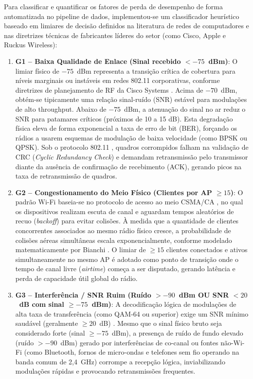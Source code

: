 Para classificar e quantificar os fatores de perda de desempenho de forma automatizada no pipeline de dados, implementou-se um classificador heurístico baseado em limiares de decisão definidos na literatura de redes de computadores e nas diretrizes técnicas de fabricantes líderes do setor (como Cisco, Apple e Ruckus Wireless):

\begin{enumerate}
    \item \textbf{G1 – Baixa Qualidade de Enlace (Sinal recebido $< -75$~dBm)}: O limiar físico de $-75$~dBm representa a transição crítica de cobertura para níveis marginais ou instáveis em redes 802.11 corporativas, conforme diretrizes de planejamento de RF da Cisco Systems \cite{cisco2020design}. Acima de $-70$~dBm, obtém-se tipicamente uma relação sinal-ruído (SNR) estável para modulações de alto throughput. Abaixo de $-75$~dBm, a atenuação do sinal no ar reduz o SNR para patamares críticos (próximos de 10 a 15 dB). Esta degradação física eleva de forma exponencial a taxa de erro de bit (BER), forçando os rádios a usarem esquemas de modulação de baixa velocidade (como BPSK ou QPSK). Sob o protocolo 802.11 \cite{gast2005}, quadros corrompidos falham na validação de CRC (\textit{Cyclic Redundancy Check}) e demandam retransmissão pelo transmissor diante da ausência de confirmação de recebimento (ACK), gerando picos na taxa de retransmissão de quadros.
    
    \item \textbf{G2 – Congestionamento do Meio Físico (Clientes por AP $\ge 15$)}: O padrão Wi-Fi baseia-se no protocolo de acesso ao meio CSMA/CA \cite{gast2005}, no qual os dispositivos realizam escuta de canal e aguardam tempos aleatórios de recuo (\textit{backoff}) para evitar colisões. À medida que a quantidade de clientes concorrentes associados ao mesmo rádio físico cresce, a probabilidade de colisões aéreas simultâneas escala exponencialmente, conforme modelado matematicamente por Bianchi \cite{bianchi2000}. O limiar de $\ge 15$ clientes conectados e ativos simultaneamente no mesmo AP é adotado como ponto de transição onde o tempo de canal livre (\textit{airtime}) começa a ser disputado, gerando latência e perda de capacidade útil global do rádio.
    
    \item \textbf{G3 – Interferência / SNR Ruim (Ruído $> -90$~dBm OU SNR $< 20$~dB com sinal $\ge -75$~dBm)}: A decodificação lógica de modulações de alta taxa de transferência (como QAM-64 ou superior) exige um SNR mínimo saudável (geralmente $\ge 20$~dB) \cite{gast2005}. Mesmo que o sinal físico bruto seja considerado forte (sinal $\ge -75$~dBm), a presença de ruído de fundo elevado (ruído $> -90$~dBm) gerado por interferências de co-canal ou fontes não-Wi-Fi (como Bluetooth, fornos de micro-ondas e telefones sem fio operando na banda comum de 2,4~GHz) corrompe a recepção lógica, inviabilizando modulações rápidas e provocando retransmissões frequentes.
    

\end{enumerate}
